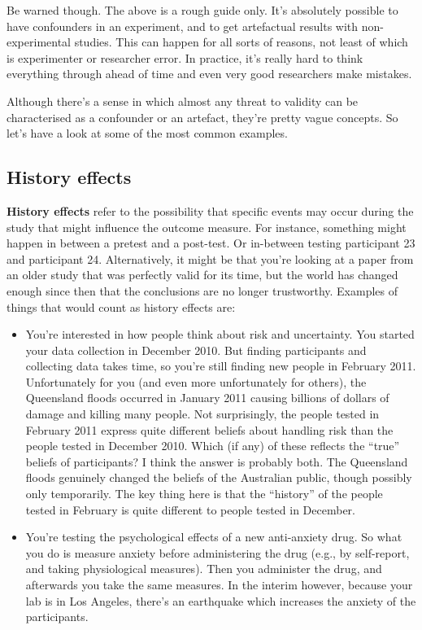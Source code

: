 \documentclass[
  a4paper,
]{book}
\begin{document}
Be warned though. The above is a rough guide only. It's absolutely
possible to have confounders in an experiment, and to get artefactual
results with non-experimental studies. This can happen for all sorts of
reasons, not least of which is experimenter or researcher error. In
practice, it's really hard to think everything through ahead of time and
even very good researchers make mistakes.

Although there's a sense in which almost any threat to validity can be
characterised as a confounder or an artefact, they're pretty vague
concepts. So let's have a look at some of the most common examples.

\hypertarget{history-effects}{%
\subsection{History effects}\label{history-effects}}

\textbf{History effects} refer to the possibility that specific events
may occur during the study that might influence the outcome measure. For
instance, something might happen in between a pretest and a post-test.
Or in-between testing participant 23 and participant 24. Alternatively,
it might be that you're looking at a paper from an older study that was
perfectly valid for its time, but the world has changed enough since
then that the conclusions are no longer trustworthy. Examples of things
that would count as history effects are:

\begin{itemize}
\item
  You're interested in how people think about risk and uncertainty. You
  started your data collection in December 2010. But finding
  participants and collecting data takes time, so you're still finding
  new people in February 2011. Unfortunately for you (and even more
  unfortunately for others), the Queensland floods occurred in January
  2011 causing billions of dollars of damage and killing many people.
  Not surprisingly, the people tested in February 2011 express quite
  different beliefs about handling risk than the people tested in
  December 2010. Which (if any) of these reflects the ``true'' beliefs
  of participants? I think the answer is probably both. The Queensland
  floods genuinely changed the beliefs of the Australian public, though
  possibly only temporarily. The key thing here is that the ``history''
  of the people tested in February is quite different to people tested
  in December.
\item
  You're testing the psychological effects of a new anti-anxiety drug.
  So what you do is measure anxiety before administering the drug (e.g.,
  by self-report, and taking physiological measures). Then you
  administer the drug, and afterwards you take the same measures. In the
  interim however, because your lab is in Los Angeles, there's an
  earthquake which increases the anxiety of the participants.
\end{itemize}
\end{document}
